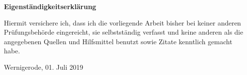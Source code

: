 \thispagestyle{empty}
\begin{LARGE}
\textbf{Eigenständigkeitserklärung}
\end{LARGE}
\bigskip
\bigskip
\par

Hiermit versichere ich, dass ich die vorliegende Arbeit bisher bei keiner anderen 
Prüfungsbehörde eingereicht, sie selbstständig verfasst und keine anderen als die 
angegebenen Quellen und Hilfsmittel benutzt sowie Zitate kenntlich gemacht habe.

\bigskip
\bigskip
\bigskip

Wernigerode, 01. Juli 2019

\clearpage
